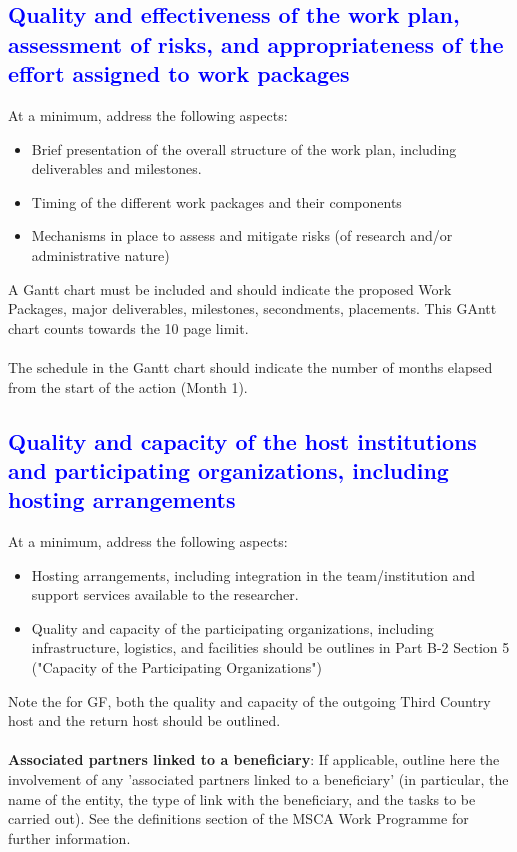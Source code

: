 \documentclass[11pt,a4paper]{article}
\begin{document}
\textcolor{Blue}{\subsection{Quality and effectiveness of the work plan, assessment of risks, and appropriateness of the effort assigned to work packages}}\label{sec:ResTable}

\color{gray}
At a minimum, address the following aspects:
\begin{itemize}
    \item Brief presentation of the overall structure of the work plan, including deliverables and milestones.
    \item Timing of the different work packages and their components
    \item Mechanisms in place to assess and mitigate risks (of research and/or administrative nature)\\
\end{itemize}
A Gantt chart must be included and should indicate the proposed Work Packages, major deliverables, milestones, secondments, placements. This GAntt chart counts towards the 10 page limit.\\
\\
The schedule in the Gantt chart should indicate the number of months elapsed from the start of the action (Month 1).
\color{black}


\textcolor{Blue}{\subsection{Quality and capacity of the host institutions and participating organizations, including hosting arrangements}}

\color{gray}
At a minimum, address the following aspects:
\begin{itemize}
    \item Hosting arrangements, including integration in the team/institution and support services available to the researcher.
    \item Quality and capacity of the participating organizations, including infrastructure, logistics, and facilities should be outlines in Part B-2 Section 5 ("Capacity of the Participating Organizations")\\
\end{itemize}
Note the for GF, both the quality and capacity of the outgoing Third Country host and the return host should be outlined.\\
\\
\textbf{Associated partners linked to a beneficiary}: If applicable, outline here the involvement of any 'associated partners linked to a beneficiary' (in particular, the name of the entity, the type of link with the beneficiary, and the tasks to be carried out). See the definitions section of the MSCA Work Programme for further information.
\color{black}









\end{document}
